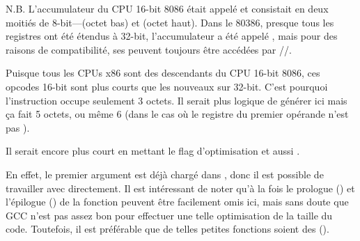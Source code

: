 N.B.  L'accumulateur du CPU 16-bit 8086 était appelé \AX et consistait en deux moitiés
de 8-bit---\AL (octet bas) et \AH (octet haut).
Dans le 80386, presque tous les registres ont été étendus à 32-bit, l'accumulateur
a été appelé \EAX, mais pour des raisons de compatibilité, ses 
peuvent toujours être accédées par \AX/\AH/\AL.

Puisque tous les CPUs x86 sont des descendants du CPU 16-bit 8086, ces 
opcodes 16-bit sont plus courts que les nouveaux sur 32-bit.
C'est pourquoi l'instruction  occupe seulement 3 octets.
Il serait plus logique de générer ici   mais ça fait 5 octets,
ou même 6 (dans le cas où le registre du premier opérande n'est pas \EAX).


Il serait encore plus court en mettant le flag d'optimisation \Othree et aussi .




En effet, le premier argument est déjà chargé dans \EAX, donc il est possible de
travailler avec directement.
Il est intéressant de noter qu'à la fois le prologue ()
et l'épilogue () de la fonction peuvent être facilement omis ici, mais
sans doute que GCC n'est pas assez bon pour effectuer une telle optimisation de la
taille du code.
Toutefois, il est préférable que de telles petites fonctions soient des  ().
